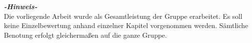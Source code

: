 \chapter*{}
\vfill
\begin{center}
\textit{\textbf{\fontsize{30}{632}\selectfont -Hinweis-}}\\

Die vorliegende Arbeit wurde als Gesamtleistung der Gruppe erarbeitet. Es soll keine Einzelbewertung anhand einzelner Kapitel vorgenommen werden. Sämtliche Benotung erfolgt gleichermaßen auf die ganze Gruppe.
\end{center}
\vfill
